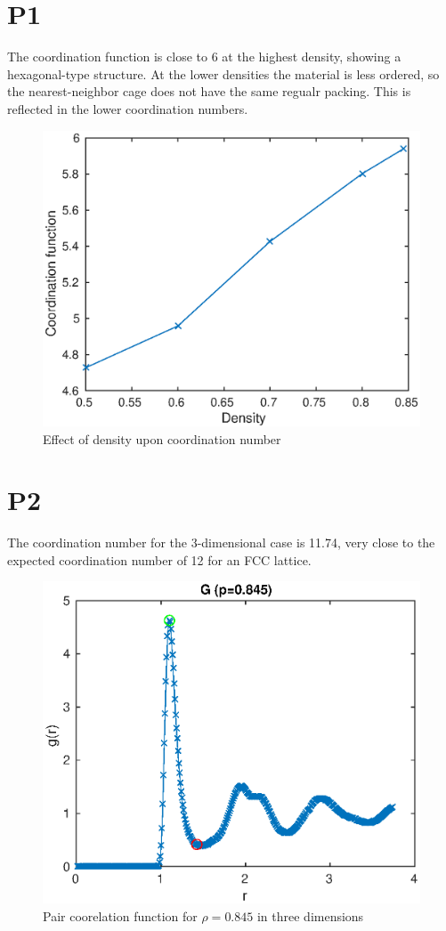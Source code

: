 \documentclass[a4paper,11pt]{article}
\numberwithin{equation}{section}
\begin{document}
\section{P1}
The coordination function is close to 6 at the highest density, showing a hexagonal-type structure. 
At the lower densities the material is less ordered, so the nearest-neighbor cage does not have the same regualr packing.
This is reflected in the lower coordination numbers.\\
\begin{figure}[h]
 \caption{Effect of density upon coordination number}
 \centering
   \includegraphics[width=\textwidth]{p1}
\end{figure}

\section{P2}
The coordination number for the 3-dimensional case is 11.74, very close to the expected coordination number of 12 for an FCC lattice.
\begin{figure}[h]
 \caption{Pair coorelation function for $\rho=0.845$ in three dimensions}
 \centering
 \includegraphics[width=\textwidth]{p2}
\end{figure}
\\
\end{document}
